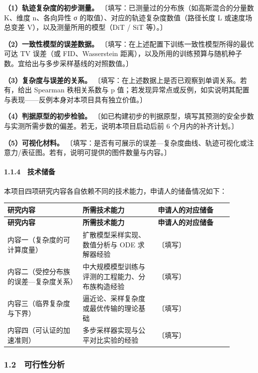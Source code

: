 \documentclass[12pt,a4paper]{ctexart}
\begin{document}
\textbf{（1）轨迹复杂度的初步测量。} 〔填写：已测量过的分布族（如高斯混合的分量数 K、维度 n、各向异性 σ 的取值）、对应的轨迹复杂度数值（路径长度 L 或速度场总变差 V），以及测量所用的模型（DiT / SiT 等）。〕

\textbf{（2）一致性模型的误差数据。} 〔填写：在上述配置下训练一致性模型所得的最优可达 TV 误差（或 FID、Wasserstein 距离），以及所用的训练预算与随机种子数。宜给出与多步采样基线的对照数值。〕

\textbf{（3）复杂度与误差的关系。} 〔填写：在上述数据上是否已观察到单调关系。若有，给出 Spearman 秩相关系数与 p 值；若发现异常点或反例，如实说明其配置与表现——反例本身对本项目具有独立价值。〕

\textbf{（4）判据原型的初步检验。} 〔如已构建初步的判据原型，填写其预测的安全步数与实测所需步数的偏差。若无，说明本项目启动后前 6 个月内的补齐计划。〕

\textbf{（5）可视化材料。} 〔填写：是否有可展示的误差—复杂度曲线、轨迹可视化或注意力/表征图。若有，说明可提供的图件数量与内容。〕

\paragraph{1.1.4　技术储备}

本项目四项研究内容各自依赖不同的技术能力，申请人的储备情况如下：

\begin{longtable}{|>{\raggedright\arraybackslash}p{0.300\linewidth}|>{\raggedright\arraybackslash}p{0.300\linewidth}|>{\raggedright\arraybackslash}p{0.300\linewidth}|}
\hline
\textbf{研究内容} & \textbf{所需技术能力} & \textbf{申请人的对应储备} \\
\hline
\endfirsthead
\hline
\textbf{研究内容} & \textbf{所需技术能力} & \textbf{申请人的对应储备} \\
\hline
\endhead
内容一（复杂度的可计算度量） & 扩散模型采样实现、数值分析与 ODE 求解器经验 & 〔填写〕 \\
\hline
内容二（受控分布族的误差—复杂度关系） & 中大规模模型训练与评测的工程能力、分布族构造经验 & 〔填写〕 \\
\hline
内容三（临界复杂度与下界） & 逼近论、采样复杂度或最优传输的理论基础 & 〔填写〕 \\
\hline
内容四（可认证的加速准则） & 多步采样器实现与公平对比实验的经验 & 〔填写〕 \\
\hline
\end{longtable}

\subsubsection*{1.2　可行性分析}
\end{document}
